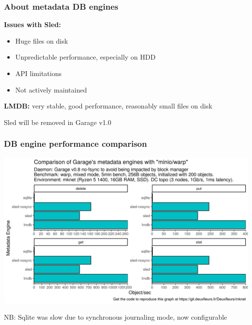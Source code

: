 \documentclass[aspectratio=169]{beamer}
\begin{document}
\begin{frame}
	\frametitle{About metadata DB engines}
	\textbf{Issues with Sled:}
	\vspace{1em}
	\begin{itemize}
		\item Huge files on disk
			\vspace{.5em}
		\item Unpredictable performance, especially on HDD
			\vspace{.5em}
		\item API limitations
			\vspace{.5em}
		\item Not actively maintained
	\end{itemize}

	\vspace{2em}
	\textbf{LMDB:} very stable, good performance, reasonably small files on disk

	\vspace{1em}
	Sled will be removed in Garage v1.0
\end{frame}

\begin{frame}
	\frametitle{DB engine performance comparison}
	\begin{center}
		\includegraphics[width=.6\linewidth]{../assets/perf/db_engine.png}
	\end{center}
	NB: Sqlite was slow due to synchronous journaling mode, now configurable
\end{frame}
\end{document}
